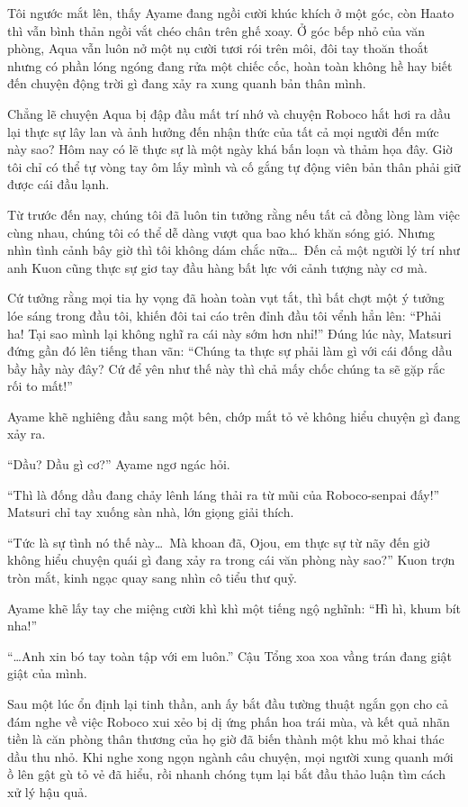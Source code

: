 \documentclass[../main.tex]{subfiles}
\begin{document}
Tôi ngước mắt lên, thấy Ayame đang ngồi cười khúc khích ở một góc, còn Haato thì vẫn bình thản ngồi vắt chéo chân trên ghế xoay. Ở góc bếp nhỏ của văn phòng, Aqua vẫn luôn nở một nụ cười tươi rói trên môi, đôi tay thoăn thoắt nhưng có phần lóng ngóng đang rửa một chiếc cốc, hoàn toàn không hề hay biết đến chuyện động trời gì đang xảy ra xung quanh bản thân mình.

Chẳng lẽ chuyện Aqua bị đập đầu mất trí nhớ và chuyện Roboco hắt hơi ra dầu lại thực sự lây lan và ảnh hưởng đến nhận thức của tất cả mọi người đến mức này sao? Hôm nay có lẽ thực sự là một ngày khá bấn loạn và thảm họa đây. Giờ tôi chỉ có thể tự vòng tay ôm lấy mình và cố gắng tự động viên bản thân phải giữ được cái đầu lạnh.

Từ trước đến nay, chúng tôi đã luôn tin tưởng rằng nếu tất cả đồng lòng làm việc cùng nhau, chúng tôi có thể dễ dàng vượt qua bao khó khăn sóng gió. Nhưng nhìn tình cảnh bây giờ thì tôi không dám chắc nữa\dots\ Đến cả một người lý trí như anh Kuon cũng thực sự giơ tay đầu hàng bất lực với cảnh tượng này cơ mà.

Cứ tưởng rằng mọi tia hy vọng đã hoàn toàn vụt tắt, thì bất chợt một ý tưởng lóe sáng trong đầu tôi, khiến đôi tai cáo trên đỉnh đầu tôi vểnh hẳn lên: ``Phải ha! Tại sao mình lại không nghĩ ra cái này sớm hơn nhỉ!'' Đúng lúc này, Matsuri đứng gần đó lên tiếng than vãn: ``Chúng ta thực sự phải làm gì với cái đống dầu bầy hầy này đây? Cứ để yên như thế này thì chả mấy chốc chúng ta sẽ gặp rắc rối to mất!''

Ayame khẽ nghiêng đầu sang một bên, chớp mắt tỏ vẻ không hiểu chuyện gì đang xảy ra.

``Dầu? Dầu gì cơ?'' Ayame ngơ ngác hỏi.

``Thì là đống dầu đang chảy lênh láng thải ra từ mũi của Roboco-senpai đấy!'' Matsuri chỉ tay xuống sàn nhà, lớn giọng giải thích.

``Tức là sự tình nó thế này\dots\ Mà khoan đã, Ojou, em thực sự từ nãy đến giờ không hiểu chuyện quái gì đang xảy ra trong cái văn phòng này sao?'' Kuon trợn tròn mắt, kinh ngạc quay sang nhìn cô tiểu thư quỷ.

Ayame khẽ lấy tay che miệng cười khì khì một tiếng ngộ nghĩnh: ``Hì hì, khum bít nha!''

``\dots Anh xin bó tay toàn tập với em luôn.'' Cậu Tổng xoa xoa vầng trán đang giật giật của mình.

Sau một lúc ổn định lại tinh thần, anh ấy bắt đầu tường thuật ngắn gọn cho cả đám nghe về việc Roboco xui xẻo bị dị ứng phấn hoa trái mùa, và kết quả nhãn tiền là căn phòng thân thương của họ giờ đã biến thành một khu mỏ khai thác dầu thu nhỏ. Khi nghe xong ngọn ngành câu chuyện, mọi người xung quanh mới ồ lên gật gù tỏ vẻ đã hiểu, rồi nhanh chóng tụm lại bắt đầu thảo luận tìm cách xử lý hậu quả.
\end{document}
